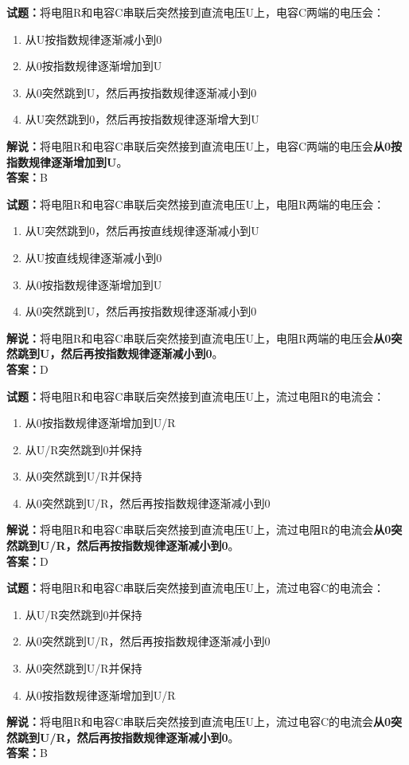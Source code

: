 \documentclass{ctexbook}
\begin{document}
\bigskip


\noindent\textbf{试题：}将电阻R和电容C串联后突然接到直流电压U上，电容C两端的电压会：
\begin{enumerate}[leftmargin=3em]
\item 从U按指数规律逐渐减小到0
\item 从0按指数规律逐渐增加到U
\item 从0突然跳到U，然后再按指数规律逐渐减小到0
\item 从U突然跳到0，然后再按指数规律逐渐增大到U
\end{enumerate}
\noindent\textbf{解说：}将电阻R和电容C串联后突然接到直流电压U上，电容C两端的电压会\textbf{从0按指数规律逐渐增加到U}。\\\noindent\textbf{答案：}B


\bigskip


\noindent\textbf{试题：}将电阻R和电容C串联后突然接到直流电压U上，电阻R两端的电压会：
\begin{enumerate}[leftmargin=3em]
\item 从U突然跳到0，然后再按直线规律逐渐减小到U
\item 从U按直线规律逐渐减小到0
\item 从0按指数规律逐渐增加到U
\item 从0突然跳到U，然后再按指数规律逐渐减小到0
\end{enumerate}
\noindent\textbf{解说：}将电阻R和电容C串联后突然接到直流电压U上，电阻R两端的电压会\textbf{从0突然跳到U，然后再按指数规律逐渐减小到0}。\\\noindent\textbf{答案：}D



\bigskip


\noindent\textbf{试题：}将电阻R和电容C串联后突然接到直流电压U上，流过电阻R的电流会：
\begin{enumerate}[leftmargin=3em]
\item 从0按指数规律逐渐增加到U/R
\item 从U/R突然跳到0并保持
\item 从0突然跳到U/R并保持
\item 从0突然跳到U/R，然后再按指数规律逐渐减小到0
\end{enumerate}
\noindent\textbf{解说：}将电阻R和电容C串联后突然接到直流电压U上，流过电阻R的电流会\textbf{从0突然跳到U/R，然后再按指数规律逐渐减小到0}。\\\noindent\textbf{答案：}D


\bigskip


\noindent\textbf{试题：}将电阻R和电容C串联后突然接到直流电压U上，流过电容C的电流会：
\begin{enumerate}[leftmargin=3em]
\item 从U/R突然跳到0并保持
\item 从0突然跳到U/R，然后再按指数规律逐渐减小到0
\item 从0突然跳到U/R并保持
\item 从0按指数规律逐渐增加到U/R
\end{enumerate}
\noindent\textbf{解说：}将电阻R和电容C串联后突然接到直流电压U上，流过电容C的电流会\textbf{从0突然跳到U/R，然后再按指数规律逐渐减小到0}。\\\noindent\textbf{答案：}B
\end{document}
